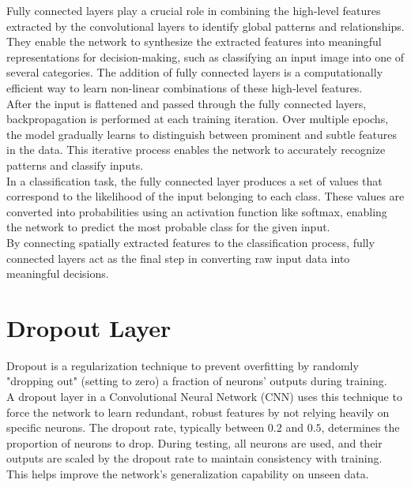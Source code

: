 Fully connected layers play a crucial role in combining the high-level features extracted by the convolutional layers to identify global patterns and relationships. They enable the network to synthesize the extracted features into meaningful representations for decision-making, such as classifying an input image into one of several categories. The addition of fully connected layers is a computationally efficient way to learn non-linear combinations of these high-level features.\\

After the input is flattened and passed through the fully connected layers, backpropagation is performed at each training iteration. Over multiple epochs, the model gradually learns to distinguish between prominent and subtle features in the data. This iterative process enables the network to accurately recognize patterns and classify inputs.\\

In a classification task, the fully connected layer produces a set of values that correspond to the likelihood of the input belonging to each class. These values are converted into probabilities using an activation function like softmax, enabling the network to predict the most probable class for the given input.\cite{krizhevsky2012imagenet}\\

By connecting spatially extracted features to the classification process, fully connected layers act as the final step in converting raw input data into meaningful decisions.

\section{Dropout Layer}
Dropout is a regularization technique to prevent overfitting by randomly "dropping out" (setting to zero) a fraction of neurons' outputs during training.\\

A dropout layer in a Convolutional Neural Network (CNN) uses this technique to force the network to learn redundant, robust features by not relying heavily on specific neurons. The dropout rate, typically between $0.2$ and $0.5$, determines the proportion of neurons to drop. During testing, all neurons are used, and their outputs are scaled by the dropout rate to maintain consistency with training. This helps improve the network's generalization capability on unseen data.\cite{srivastava2014dropout}
